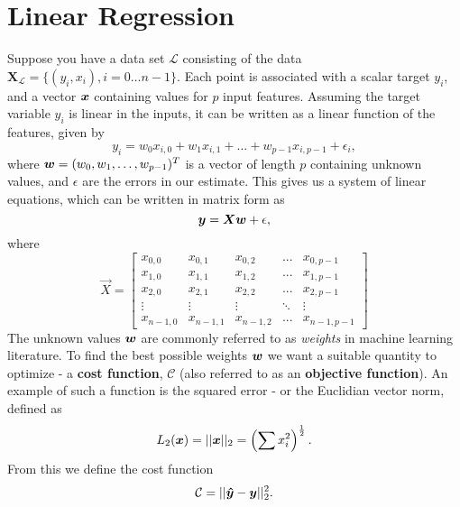 \section{Linear Regression}\label{sec:linreg}
Suppose you have a data set $\mathcal{L}$ consisting of the data
$\mathbf{X}_\mathcal{L}=\{(y_i, x_i), i=0\ldots n-1\}$. Each point is associated
with a scalar target $y_i$, and a vector ${\boldsymbol{x}}$ containing values for $p$ input
features. Assuming the target variable $y_i$ is linear in the inputs, it can be
written as a linear function of the features, given by
\begin{equation}\label{eq:ols-target}
y_i = w_0 x_{i,0} + w_1 x_{i,1} + ... + w_{p-1} x_{i, p-1} + \epsilon_i,
\end{equation}
where ${\boldsymbol{w}} = (w_0, w_1, \dots, w_{p-1})^T$ is a vector of length
$p$ containing unknown values, and $\epsilon$ are the errors in our estimate.
This gives us a system of linear equations, which can be written in matrix form as
\begin{equation}\label{eq:ols-target-mat}
  {\boldsymbol{y}} = {\boldsymbol{Xw}} + {\boldsymbol{}}{\epsilon},
\end{equation}
where
\begin{equation}
\vec{X} = \left[
\begin{matrix}
x_{0,0} & x_{0,1} & x_{0,2} & ... & x_{0,p-1}\\
x_{1,0} & x_{1,1} & x_{1,2} & ... & x_{1,p-1}\\
x_{2,0} & x_{2,1} & x_{2,2} & ... & x_{2,p-1}\\
\vdots & \vdots & \vdots & \ddots & \vdots\\
x_{n-1,0} & x_{n-1,1} & x_{n-1,2} & ... & x_{n-1,p-1}
\end{matrix}
\right]
\end{equation}
The unknown values ${\boldsymbol{w}}$ are commonly referred to as \textit{weights} in machine 
learning literature. To find the best possible weights ${\boldsymbol{w}}$ we want a suitable
quantity to optimize - a \textbf{cost function}, $\mathcal{C}$ (also referred to as an
\textbf{objective function}). An example of such a function is the squared error - or the Euclidian vector norm, defined as
\begin{equation}
	L_2({\boldsymbol{x}}) =||{\boldsymbol{x}}||_2 = \left(\sum x_i^2\right)^{\frac{1}{2}}.
\end{equation}
From this we define the cost function
\begin{equation}
	\mathcal{C} = || {\boldsymbol{\hat{y}}} - {\boldsymbol{y}} ||_2 ^2. \label{eq:cost-mse}
\end{equation}
